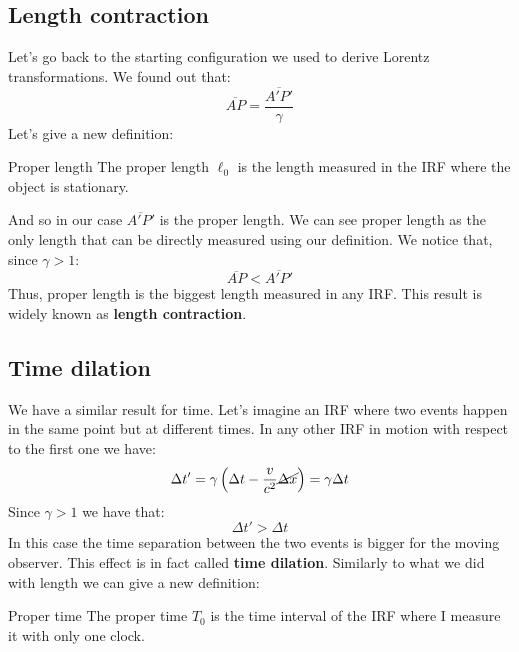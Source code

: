 \subsection{Length contraction}
Let's go back to the starting configuration we used to derive Lorentz transformations. We found out that:
\begin{equation}
  \overline{AP} = \dfrac{\overline{A'P'}}{\gamma}
\end{equation}
Let's give a new definition:
\begin{definition}{Proper length}
  The proper length $\ell_0$ is the length measured in the IRF where the object is stationary.
\end{definition}
And so in our case $\overline{A'P'}$ is the proper length. We can see proper length as the only length that can be directly measured using our definition. We notice that, since $\gamma >1$:
\begin{equation}
  \overline{AP} < \overline{A'P'}
\end{equation}
Thus, proper length is the biggest length measured in any IRF. This result is widely known as \textbf{length contraction}.
\subsection{Time dilation}
We have a similar result for time. Let's imagine an IRF where two events happen in the same point but at different times. In any other IRF in motion with respect to the first one we have:
\begin{equation}
  \Delta t' = \gamma\left(\Delta t - \dfrac{v}{c^2}\cancel{\Delta x}\right) = \gamma \Delta t
\end{equation}
Since $\gamma > 1$ we have that:
\begin{equation}
  \Delta t' > \Delta t
\end{equation}
In this case the time separation between the two events is bigger for the moving observer. This effect is in fact called \textbf{time dilation}. Similarly to what we did with length we can give a new definition:
\begin{definition}{Proper time}
  The proper time $T_0$ is the time interval of the IRF where I measure it with only one clock.
\end{definition}
